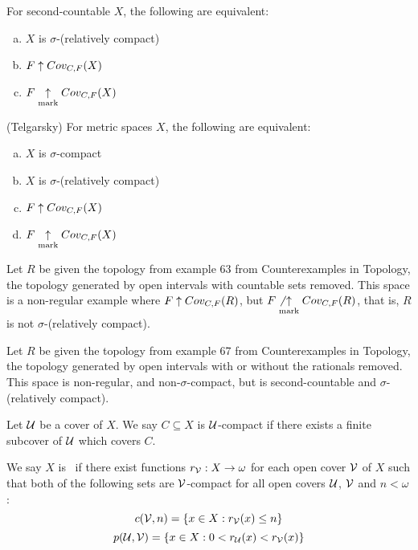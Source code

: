   \begin{thm}
    For second-countable $X$, the following are equivalent:
      \begin{enumerate}[(a)]
        \item $X$ is $\sigma$-(relatively compact)
        \item $F \uparrow Cov_{C,F}(X)$
        \item $F\underset{\text{mark}}{\uparrow} Cov_{C,F}(X)$
      \end{enumerate}
  \end{thm}

  \begin{cor}(Telgarsky)
    For metric spaces $X$, the following are equivalent:
      \begin{enumerate}[(a)]
        \item $X$ is $\sigma$-compact
        \item $X$ is $\sigma$-(relatively compact)
        \item $F \uparrow Cov_{C,F}(X)$
        \item $F \underset{\text{mark}}{\uparrow} Cov_{C,F}(X)$
      \end{enumerate}
  \end{cor}

  \begin{ex}
  Let $R$ be given the topology from example 63 from Counterexamples in Topology, the topology generated by open intervals with countable sets removed. This space is a non-regular example where $F \uparrow Cov_{C,F}(R)$, but $F \not\underset{\text{mark}}{\uparrow} Cov_{C,F}(R)$, that is, $R$ is not $\sigma$-(relatively compact).
  \end{ex}

  \begin{ex}
  Let $R$ be given the topology from example 67 from Counterexamples in Topology, the topology generated by open intervals with or without the rationals removed. This space is non-regular, and non-$\sigma$-compact, but is second-countable and $\sigma$-(relatively compact).
  \end{ex}

  \begin{defn}
    Let $\mathcal{U}$ be a cover of $X$. We say $C\subseteq X$ is $\mathcal{U}$-compact if there exists a finite subcover of $\mathcal{U}$ which covers $C$.

    We say $X$ is \scish~if there exist functions $r_{\mathcal{V}}:X\to\omega$ for each open cover $\mathcal{V}$ of $X$ such that both of the following sets are $\mathcal{V}$-compact for all open covers $\mathcal{U}$, $\mathcal{V}$ and $n<\omega$:
      \[
        c(\mathcal{V},n)=\{ x\in X : r_{\mathcal{V}}(x)\leq n\}
      \]
      \[
        p(\mathcal{U},\mathcal{V})=\{ x\in X : 0<r_{\mathcal{U}}(x)<r_{\mathcal{V}}(x)\}
      \]
  \end{defn}

